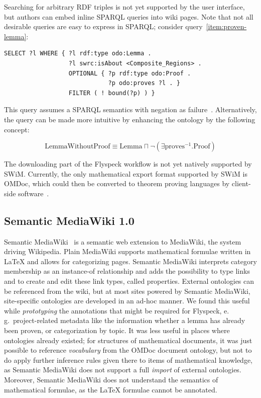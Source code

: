 \documentclass{llncs}
\begin{document}
Searching for arbitrary RDF triples is not yet supported by the user interface,
but authors can embed inline SPARQL queries into wiki pages.  Note that not all desirable
queries are easy to express in SPARQL; consider query~\ref{item:proven-lemma}:

\begin{lstlisting}
SELECT ?l WHERE { ?l rdf:type odo:Lemma .
                  ?l swrc:isAbout <Composite_Regions> .
                  OPTIONAL { ?p rdf:type odo:Proof .
                             ?p odo:proves ?l . }
                  FILTER ( ! bound(?p) ) }
\end{lstlisting}

This query assumes a SPARQL semantics with negation as failure~\cite{Polleres:SPARQL-Rules07}.  Alternatively, the query
can be made more intuitive by enhancing the ontology by the following concept:

\[
\mbox{LemmaWithoutProof}\equiv\mbox{Lemma}\sqcap\neg(\exists\mbox{proves}^{-1}.\mbox{Proof})
\]

The downloading part of the Flyspeck workflow is not yet natively supported by SWiM.
Currently, the only mathematical export format supported by SWiM is OMDoc, which could
then be converted to theorem proving languages by client-side software~\cite[chap.\
25.2]{Kohlhase:omdoc1.2}.

\subsection{Semantic MediaWiki 1.0}
\label{sec:smw-study}

Semantic MediaWiki~\cite{KrSchVr:semwiki-reasoning07} is a semantic web extension to
MediaWiki, the system driving Wikipedia.  Plain MediaWiki supports mathematical formulae
written in {\LaTeX} and allows for categorizing pages.  Semantic MediaWiki interprets
category membership as an instance-of relationship and adds the possibility to type links
and to create and edit these link types, called properties.  External ontologies can be
referenced from the wiki, but at most sites powered by Semantic MediaWiki, site-specific
ontologies are developed in an ad-hoc manner.  We found this useful while
\emph{prototyping} the annotations that might be required for Flyspeck, e.\,g.\
project-related metadata like the information whether a lemma has already been proven, or
categorization by topic.  It was less useful in places where ontologies already existed;
for structures of mathematical documents, it was just possible to reference
\emph{vocabulary} from the OMDoc document ontology, but not to do apply further inference
rules given there to items of mathematical knowledge, as Semantic MediaWiki does not
support a full \emph{import} of external ontologies.  Moreover, Semantic MediaWiki does
not understand the semantics of mathematical formulae, as the {\LaTeX} formulae cannot be
annotated.
\end{document}
